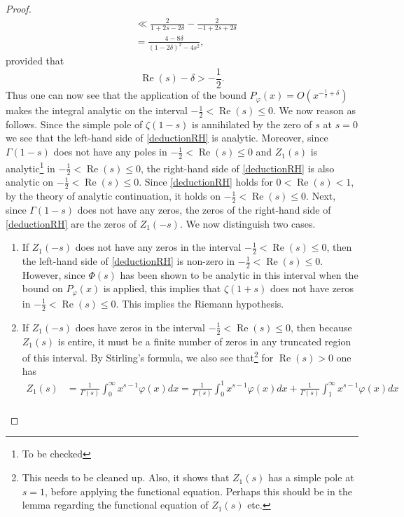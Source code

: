 \documentclass[11pt]{article}
\newcommand{\real}{\operatorname{Re}}
\numberwithin{equation}{section}		 			%
\numberwithin{figure}{section}			 			%
\begin{document}
\begin{proof}
\begin{align}
   &\ll \frac{2}{{1 + 2s - 2\delta }} - \frac{2}{{ - 1 + 2s + 2\delta }} \nonumber \\
   &= \frac{{4 - 8\delta }}{{{{(1 - 2\delta )}^2} - 4{s^2}}}, \nonumber 
\end{align}
provided that
\[\operatorname{Re} (s) - \delta  >  - \frac{1}{2}.\]
Thus one can now see that the application of the bound ${P_\varphi }(x) = O({x^{ - \tfrac{1}{2} + \delta }})$ makes the integral analytic on the interval $-\tfrac{1}{2} < \real(s) \le 0$. We now reason as follows. Since the simple pole of $\zeta(1-s)$ is annihilated by the zero of $s$ at $s=0$ we see that the left-hand side of \eqref{deductionRH} is analytic. Moreover, since $\Gamma(1-s)$ does not have any poles in $-\tfrac{1}{2} < \real(s) \le 0$ and $Z_1(s)$ is analytic\footnote{To be checked} in $-\tfrac{1}{2} < \real(s) \le 0$, the right-hand side of \eqref{deductionRH} is also analytic on $-\tfrac{1}{2} < \real(s) \le 0$. Since \eqref{deductionRH} holds for $0 < \real(s) < 1$, by the theory of analytic continuation, it holds on $-\tfrac{1}{2} < \real(s) \le 0$. Next, since $\Gamma(1-s)$ does not have any zeros, the zeros of the right-hand side of \eqref{deductionRH} are the zeros of $Z_1(-s)$. We now distinguish two cases.
\begin{enumerate}
\item If $Z_1(-s)$ does not have any zeros in the interval $-\tfrac{1}{2} < \real(s) \le 0$, then the left-hand side of \eqref{deductionRH} is non-zero in $-\tfrac{1}{2} < \real(s) \le 0$. However, since $\Phi(s)$ has been shown to be analytic in this interval when the bound on $P_\varphi(x)$ is applied, this implies that $\zeta(1+s)$ does not have zeros in $-\tfrac{1}{2} < \real(s) \le 0$. This implies the Riemann hypothesis.
\item If $Z_1(-s)$ does have zeros in the interval $-\tfrac{1}{2} < \real(s) \le 0$, then because $Z_1(s)$ is entire, it must be a finite number of zeros in any truncated region of this interval. By Stirling's formula, we also see that\footnote{This needs to be cleaned up. Also, it shows that $Z_1(s)$ has a simple pole at $s=1$, before applying the functional equation. Perhaps this should be in the lemma regarding the functional equation of $Z_1(s)$ etc.} for $\real(s)>0$ one has
\begin{align} \label{whynofluctuation}
  {Z_1}(s) &= \frac{1}{{\Gamma (s)}}\int_0^\infty  {{x^{s - 1}}\varphi (x)dx}  = \frac{1}{{\Gamma (s)}}\int_0^1 {{x^{s - 1}}\varphi (x)dx}  + \frac{1}{{\Gamma (s)}}\int_1^\infty  {{x^{s - 1}}\varphi (x)dx}  \nonumber \\

\end{align}
\end{enumerate}
\end{proof}
\end{document}
